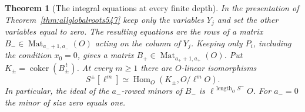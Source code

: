 \documentclass[a4paper,11pt]{article}
\newtheorem{theorem}[proposition]{Theorem}
\theoremstyle{definition}
\theoremstyle{remark}
\numberwithin{equation}{section}
\begin{document}
\begin{theorem}[The integral equations at every finite depth]
\leavevmode\label{thm:integralroots547}
In the presentation of Theorem~\ref{thm:allglobalroots547} keep
only the variables \(Y_j\) and set the other variables equal to
zero. The resulting equations are the rows of a matrix
\(B_-\in\operatorname{Mat}_{a_-+1,a_-}(O)\) acting on the column
of \(Y_j\). Keeping only \(P_i\), including the condition \(x_0=0\),
gives a matrix \(B_+\in\operatorname{Mat}_{a_++1,a_+}(O)\).
Put \(K_\pm=\operatorname{coker}(B_\pm^{\,t})\). At every
\(m\ge1\) there are \(O\)-linear isomorphisms
\[
 S^\pm[\ell^m]\simeq\operatorname{Hom}_O(K_\pm,O/\ell^mO).
\]
In particular, the ideal of the \(a_-\)-rowed minors of \(B_-\)
is \(\ell^{\,\operatorname{length}_O S^-}O\). For \(a_-=0\)
the minor of size zero equals one.
\end{theorem}
\end{document}
